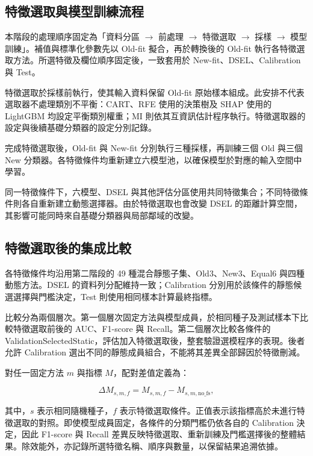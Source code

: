 \subsection{特徵選取與模型訓練流程}

本階段的處理順序固定為「資料分區 \ensuremath{\rightarrow} 前處理 \ensuremath{\rightarrow} 特徵選取 \ensuremath{\rightarrow} 採樣 \ensuremath{\rightarrow} 模型訓練」。補值與標準化參數先以 Old-fit 擬合，再於轉換後的 Old-fit 執行各特徵選取方法。所選特徵及欄位順序固定後，一致套用於 New-fit、DSEL、Calibration 與 Test。

特徵選取於採樣前執行，使其輸入資料保留 Old-fit 原始樣本組成。此安排不代表選取器不處理類別不平衡：CART、RFE 使用的決策樹及 SHAP 使用的 LightGBM 均設定平衡類別權重；MI 則依其互資訊估計程序執行。特徵選取器的設定與後續基礎分類器的設定分別記錄。

完成特徵選取後，Old-fit 與 New-fit 分別執行三種採樣，再訓練三個 Old 與三個 New 分類器。各特徵條件均重新建立六模型池，以確保模型於對應的輸入空間中學習。

同一特徵條件下，六模型、DSEL 與其他評估分區使用共同特徵集合；不同特徵條件則各自重新建立動態選擇器。由於特徵選取也會改變 DSEL 的距離計算空間，其影響可能同時來自基礎分類器與局部鄰域的改變。

\subsection{特徵選取後的集成比較}

各特徵條件均沿用第二階段的 49 種混合靜態子集、Old3、New3、Equal6 與四種動態方法。DSEL 的資料列分配維持一致；Calibration 分別用於該條件的靜態候選選擇與門檻決定，Test 則使用相同樣本計算最終指標。

比較分為兩個層次。第一個層次固定方法與模型成員，於相同種子及測試樣本下比較特徵選取前後的 AUC、F1-score 與 Recall。第二個層次比較各條件的 ValidationSelectedStatic，評估加入特徵選取後，整套驗證選模程序的表現。後者允許 Calibration 選出不同的靜態成員組合，不能將其差異全部歸因於特徵刪減。

對任一固定方法 \(m\) 與指標 \(M\)，配對差值定義為：

\begin{equation}\label{eq:method-delta}
\Delta M_{s,m,f}
=M_{s,m,f}-M_{s,m,\mathrm{no\_fs}},
\end{equation}

其中，\(s\) 表示相同隨機種子，\(f\) 表示特徵選取條件。正值表示該指標高於未進行特徵選取的對照。即使模型成員固定，各條件的分類門檻仍依各自的 Calibration 決定，因此 F1-score 與 Recall 差異反映特徵選取、重新訓練及門檻選擇後的整體結果。除效能外，亦記錄所選特徵名稱、順序與數量，以保留結果追溯依據。

